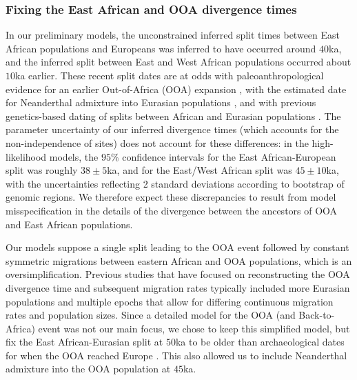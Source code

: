 \documentclass[]{article}
\begin{document}
\subsubsection{Fixing the East African and OOA divergence times}

In our preliminary models, the unconstrained inferred split times between East
African populations and Europeans was inferred to have occurred around $40$ka,
and the inferred split between East and West African populations occurred about
$10$ka earlier. These recent split dates are at odds with paleoanthropological 
evidence for an earlier Out-of-Africa (OOA) expansion
\citep[e.g.][]{Fu2014-am,Hublin2020-nk,Hajdinjak2021-jo}, with the estimated date
for Neanderthal admixture into Eurasian populations
\citep[e.g.][]{Reilly2022-ym}, and with previous genetics-based dating of
splits between African and Eurasian populations
\citep[e.g.]{Gutenkunst2009-ff,Jouganous2017-pq,Kamm2020-vn}. The parameter
uncertainty of our inferred divergence times (which accounts for the
non-independence of sites) does not account for these differences: in the
high-likelihood models, the $95\%$ confidence intervals for the East
African-European split was roughly $38 \pm 5$ka, and for the East/West African
split was $45 \pm 10$ka, with the uncertainties reflecting 2 standard
deviations according to bootstrap of genomic regions. We therefore expect these
discrepancies to result from model misspecification in the details of the
divergence between the ancestors of OOA and East African populations.

Our models suppose a single split leading to the OOA event followed by constant
symmetric migrations between eastern African and OOA populations, which is an
oversimplification. Previous studies that have focused on reconstructing the
OOA divergence time and subsequent migration rates typically included more
Eurasian populations and multiple epochs that allow for differing continuous
migration rates and population sizes. Since a detailed model for the OOA (and
Back-to-Africa) event was not our main focus, we chose to keep this simplified
model, but fix the East African-Eurasian split at $50$ka to be older than 
archaeological dates for when the OOA reached Europe 
\citep{Fewlass2020-se,Hublin2020-nk}. This also allowed us to include 
Neanderthal admixture into the OOA population at $45$ka.
\end{document}
